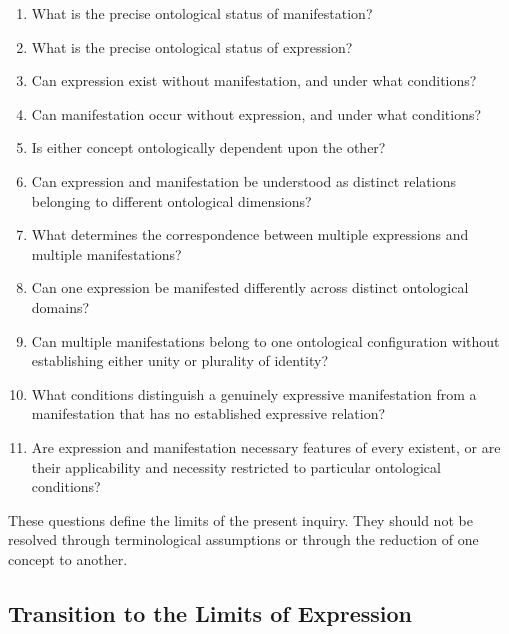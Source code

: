 \begin{enumerate}
    \item What is the precise ontological status of
    manifestation?

    \item What is the precise ontological status of
    expression?

    \item Can expression exist without manifestation,
    and under what conditions?

    \item Can manifestation occur without expression,
    and under what conditions?

    \item Is either concept ontologically dependent
    upon the other?

    \item Can expression and manifestation be understood
    as distinct relations belonging to different
    ontological dimensions?

    \item What determines the correspondence between
    multiple expressions and multiple manifestations?

    \item Can one expression be manifested differently
    across distinct ontological domains?

    \item Can multiple manifestations belong to one
    ontological configuration without establishing
    either unity or plurality of identity?

    \item What conditions distinguish a genuinely
    expressive manifestation from a manifestation
    that has no established expressive relation?

    \item Are expression and manifestation necessary
    features of every existent, or are their applicability
    and necessity restricted to particular ontological
    conditions?
\end{enumerate}

These questions define the limits of the present inquiry.
They should not be resolved through terminological
assumptions or through the reduction of one concept
to another.

\subsection{Transition to the Limits of Expression}

